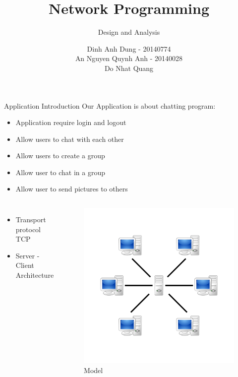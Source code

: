 \documentclass{beamer}
\title[Short Title]{Network Programming}
\subtitle{Design and Analysis}
\author{Dinh Anh Dung - 20140774 \\ An Nguyen Quynh Anh - 20140028 \\ Do Nhat Quang }
\institute{\large \textbf{Hanoi University of Science and Technology}}
\date{}
\begin{document}
\begin{frame}
\titlepage
\end{frame}

\begin{frame}{Application Introduction}
Our Application is about chatting program:

\begin{itemize}
\item Application require login and logout
\item Allow users to chat with each other
\item Allow users to create a group
\item Allow user to chat in a group
\item Allow user to send pictures to others
\end{itemize}
\end{frame}


\begin{frame}
\begin{columns}
\begin{itemize}
\item Transport protocol TCP
\item Server - Client Architecture
\end{itemize}
\begin{figure}
\includegraphics[scale=0.15]{1200px-Server-based-network.svg.png}
\caption{Model}
\end{figure}
\end{columns}
\end{frame}
\end{document}
